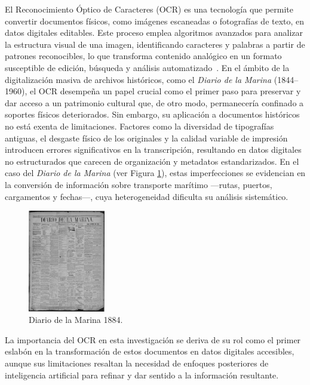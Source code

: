 El Reconocimiento Óptico de Caracteres (OCR) es una tecnología que permite convertir documentos físicos, como imágenes escaneadas o fotografías de texto, en datos digitales editables. Este proceso emplea algoritmos avanzados para analizar la estructura visual de una imagen, identificando caracteres y palabras a partir de patrones reconocibles, lo que transforma contenido analógico en un formato susceptible de edición, búsqueda y análisis automatizado~\cite{piryani2025multilocraqa}. En el ámbito de la digitalización masiva de archivos históricos, como el \textit{Diario de la Marina} (1844–1960), el OCR desempeña un papel crucial como el primer paso para preservar y dar acceso a un patrimonio cultural que, de otro modo, permanecería confinado a soportes físicos deteriorados.
Sin embargo, su aplicación a documentos históricos no está exenta de limitaciones. Factores como la diversidad de tipografías antiguas, el desgaste físico de los originales y la calidad variable de impresión introducen errores significativos en la transcripción, resultando en datos digitales no estructurados que carecen de organización y metadatos estandarizados. En el caso del \textit{Diario de la Marina} (ver Figura \ref{fig:Diario de la Marina 1884}), estas imperfecciones se evidencian en la conversión de información sobre transporte marítimo —rutas, puertos, cargamentos y fechas—, cuya heterogeneidad dificulta su análisis sistemático.

\begin{figure}[h]
	\centering
	\includegraphics[width=0.3\textwidth]{images/diario}
	\caption{Diario de la Marina 1884.}
	\label{fig:Diario de la Marina 1884}
\end{figure}

La importancia del OCR en esta investigación se deriva de su rol como el primer eslabón en la transformación de estos documentos en datos digitales accesibles, aunque sus limitaciones resaltan la necesidad de enfoques posteriores de inteligencia artificial para refinar y dar sentido a la información resultante.

